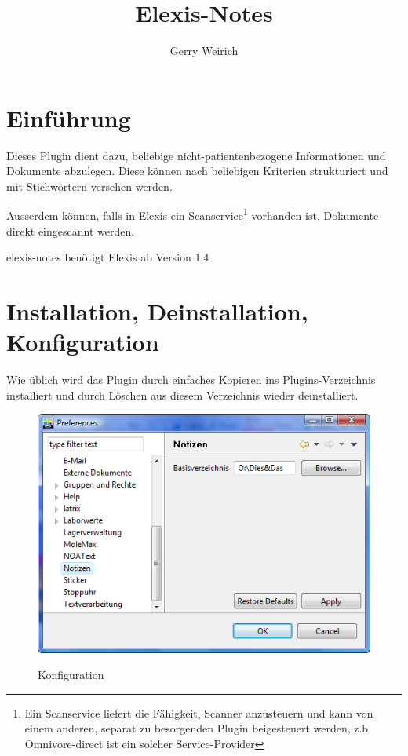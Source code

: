\documentclass[a4paper]{scrartcl}
\begin{document}
\title{Elexis-Notes}
\author{Gerry Weirich}
\maketitle

\section{Einführung}
Dieses Plugin dient dazu, beliebige nicht-patientenbezogene Informationen und Dokumente abzulegen. Diese können nach beliebigen Kriterien strukturiert und mit Stichwörtern versehen werden.

Ausserdem können, falls in Elexis ein Scanservice\footnote{Ein Scanservice liefert die Fähigkeit, Scanner anzusteuern und kann von einem anderen, separat zu besorgenden Plugin beigesteuert werden, z.b. Omnivore-direct ist ein solcher Service-Provider} vorhanden ist, Dokumente direkt eingescannt werden.

\medskip

elexis-notes benötigt Elexis ab Version 1.4

\section{Installation, Deinstallation, Konfiguration}
Wie üblich wird das Plugin durch einfaches Kopieren ins Plugins-Verzeichnis installiert und durch Löschen aus diesem Verzeichnis wieder deinstalliert.

\begin{figure}
  \includegraphics{config}\\
  \caption{Konfiguration}\label{fig:notes1}
\end{figure}
\end{document}
